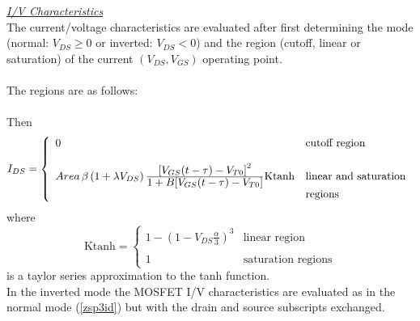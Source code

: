 \noindent\underline{\sl I/V Characteristics}\\[0.1in]

The current/voltage characteristics are evaluated after first
determining the mode (normal: $V_{DS} \ge 0$ or inverted:
$V_{DS} < 0$) and the region (cutoff,
linear or saturation) of the current
$(V_{DS}, V_{GS})$ operating point.\\[0.1in]

\\[0.2in]
The regions are as follows:\\[0.1in]
\hspace*{\fill}\\[0.1in]
Then
\begin{equation}
I_{DS} = \left\{ \begin{array}{ll}
      0  & \mbox{cutoff region} \\ \\
      Area\,\beta
      \left(1 + \lambda V_{DS}\right)
      {{\textstyle\left[V_{GS}(t-\tau)-V_{T0}\right]^2}\over
      {\textstyle 1 + B[{V_{GS}(t-\tau)-V_{T0}]}}}
      \mbox{Ktanh}
         &\mbox{linear and saturation}\\
         &\mbox{regions} \end{array} \right. %
      \label{zsp3id}
\end{equation}
where
\begin{equation}
\mbox{Ktanh} = \left\{ \begin{array}{ll}
       1 - \left(1 - V_{DS} \frac{\alpha}{3}\right)^3
        & \mbox{linear region} \\ \\
      1
         &\mbox{saturation regions} \end{array} \right. %
\end{equation}
is a taylor series approximation to the tanh function.
\\[0.2in]
In the inverted mode the MOSFET I/V characteristics are evaluated as in the
normal mode (\ref{zsp3id}) but with the drain and source subscripts
exchanged.


